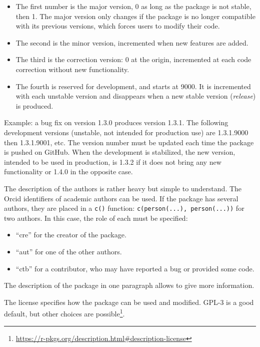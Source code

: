 \documentclass[
  12pt,
  american,
  a4paper,
  extrafontsizes,onecolumn,openright
  ]{memoir}
\providecommand{\tightlist}{%
  \setlength{\itemsep}{0pt}\setlength{\parskip}{0pt}}
\begin{document}
\begin{itemize}
\tightlist
\item
  The first number is the major version, 0 as long as the package is not stable, then 1.
  The major version only changes if the package is no longer compatible with its previous versions, which forces users to modify their code.
\item
  The second is the minor version, incremented when new features are added.
\item
  The third is the correction version: 0 at the origin, incremented at each code correction without new functionality.
\item
  The fourth is reserved for development, and starts at 9000.
  It is incremented with each unstable version and disappears when a new stable version (\emph{release}) is produced.
\end{itemize}

Example: a bug fix on version 1.3.0 produces version 1.3.1.
The following development versions (unstable, not intended for production use) are 1.3.1.9000 then 1.3.1.9001, etc.
The version number must be updated each time the package is pushed on GitHub.
When the development is stabilized, the new version, intended to be used in production, is 1.3.2 if it does not bring any new functionality or 1.4.0 in the opposite case.

The description of the authors is rather heavy but simple to understand.
The Orcid identifiers of academic authors can be used.
If the package has several authors, they are placed in a \texttt{c()} function: \texttt{c(person(...),\ person(...))} for two authors.
In this case, the role of each must be specified:

\begin{itemize}
\tightlist
\item
  \enquote{cre} for the creator of the package.
\item
  \enquote{aut} for one of the other authors.
\item
  \enquote{ctb} for a contributor, who may have reported a bug or provided some code.
\end{itemize}

The description of the package in one paragraph allows to give more information.

The license specifies how the package can be used and modified.
GPL-3 is a good default, but other choices are possible\footnote{\url{https://r-pkgs.org/description.html\#description-license}}.
\end{document}
